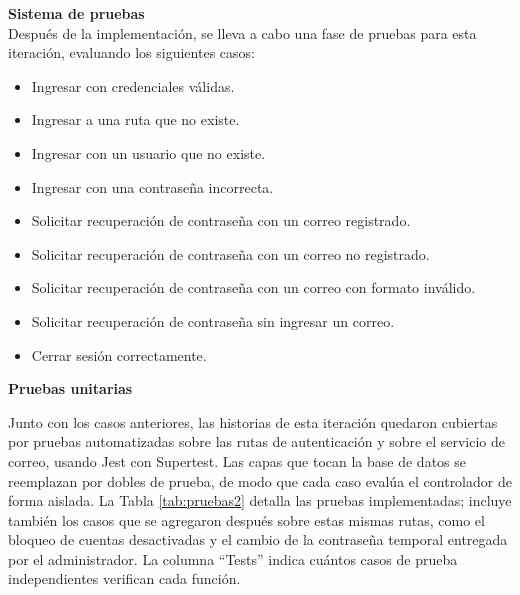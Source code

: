 \documentclass[12pt,letterpaper,oneside]{report}
\newcommand{\titulopar}[1]{\par\textbf{#1}\par}
\newcommand{\tituloparpegado}[1]{\par\textbf{#1}\\\indent\ignorespaces}
\begin{document}
\tituloparpegado{Sistema de pruebas}
Después de la implementación, se lleva a cabo una fase de pruebas para esta iteración, evaluando los siguientes casos:

\begin{itemize}
  \item Ingresar con credenciales válidas.
  \item Ingresar a una ruta que no existe.
  \item Ingresar con un usuario que no existe.
  \item Ingresar con una contraseña incorrecta.
  \item Solicitar recuperación de contraseña con un correo registrado.
  \item Solicitar recuperación de contraseña con un correo no registrado.
  \item Solicitar recuperación de contraseña con un correo con formato inválido.
  \item Solicitar recuperación de contraseña sin ingresar un correo.
  \item Cerrar sesión correctamente.
\end{itemize}

\vspace{\parskip}
\titulopar{Pruebas unitarias}
Junto con los casos anteriores, las historias de esta iteración quedaron cubiertas por pruebas automatizadas sobre las rutas de autenticación y sobre el servicio de correo, usando Jest con Supertest. Las capas que tocan la base de datos se reemplazan por dobles de prueba, de modo que cada caso evalúa el controlador de forma aislada. La Tabla \ref{tab:pruebas2} detalla las pruebas implementadas; incluye también los casos que se agregaron después sobre estas mismas rutas, como el bloqueo de cuentas desactivadas y el cambio de la contraseña temporal entregada por el administrador. La columna ``Tests'' indica cuántos casos de prueba independientes verifican cada función.
\end{document}

